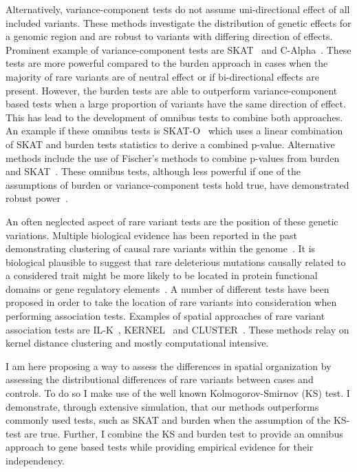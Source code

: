 Alternatively, variance-component tests do not assume uni-directional effect of all included variants. 
These methods investigate the distribution of genetic effects for a genomic region and are robust to variants with differing direction of effects.
Prominent example of variance-component tests are SKAT~\cite{Wu2011} and C-Alpha~\cite{Neale2011}.
These tests are more powerful compared to the burden approach in cases when the majority of rare variants are of neutral effect or if bi-directional effects are present.
However, the burden tests are able to outperform variance-component based tests when a large proportion of variants have the same direction of effect.
This has lead to the development of omnibus tests to combine both approaches.
An example if these omnibus tests is SKAT-O~\cite{Lee2012a} which uses a linear combination of SKAT and burden tests statistics to derive a combined p-value.
Alternative methods include the use of Fischer's methods to combine p-values from burden and SKAT~\cite{Derkach2013a}.
These omnibus tests, although less powerful if one of the assumptions of burden or variance-component tests hold true, have demonstrated robust power~\cite{Lee2014}. 

An often neglected aspect of rare variant tests are the position of these genetic variations.
Multiple biological evidence has been reported in the past demonstrating clustering of causal rare variants within the genome~\cite{Ionita-Laza2012, Raab2010,Schaid2013,Fier2012}.
It is biological plausible to suggest that rare deleterious mutations causally related to a considered trait might be more likely to be located in protein functional domains or gene regulatory elements~\cite{Fier2012}.
A number of different tests have been proposed in order to take the location of rare variants into consideration when performing association tests.
Examples of spatial approaches of rare variant association tests are IL-K~\cite{Ionita-Laza2012}, KERNEL~\cite{Schaid2013} and CLUSTER~\cite{Lin2014}.
These methods relay on kernel distance clustering and mostly computational intensive.

I am here proposing a way to assess the differences in spatial organization by assessing the distributional differences of rare variants between cases and controls.
To do so I make use of the well known Kolmogorov-Smirnov (KS) test.
I demonstrate, through extensive simulation, that our methods outperforms commonly used tests, such as SKAT and burden when the assumption of the KS-test are true.
Further, I combine the KS and burden test to provide an omnibus approach to gene based tests while providing empirical evidence for their independency.
